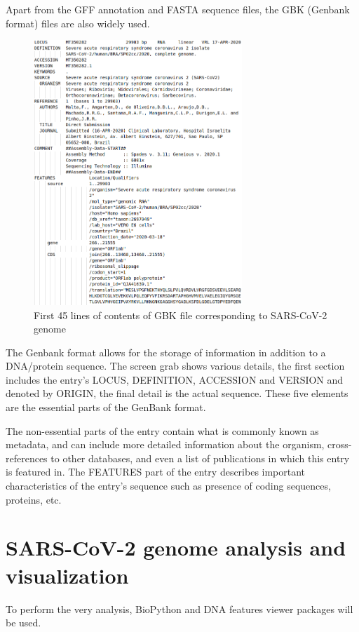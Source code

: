 Apart from the GFF annotation and FASTA sequence files, the GBK (Genbank format) files are also widely used. 
\begin{figure}[!ht]
	\centering
	\includegraphics[width=0.7\textwidth]{figures/gbk.png}
	\caption{First 45 lines of contents of GBK file corresponding to SARS-CoV-2 genome\label{o:latex_friendly_zone}}
\end{figure}
The Genbank format allows for the storage of information in addition to a DNA/protein sequence.
The screen grab shows various details, the first section includes the entry’s LOCUS, DEFINITION, ACCESSION and VERSION and denoted by ORIGIN, the final detail is the actual sequence. 
These five elements are the essential parts of the GenBank format.

The non-essential parts of the entry contain what is commonly known as metadata, and can include more detailed information about the organism, cross-references to other databases, and even a list of publications in which this entry is featured in.
The FEATURES part of the entry describes important characteristics of the entry’s sequence such as presence of coding sequences, proteins, etc.

\section{SARS-CoV-2 genome analysis and visualization}
To perform the very analysis, BioPython and DNA features viewer packages will be used.

